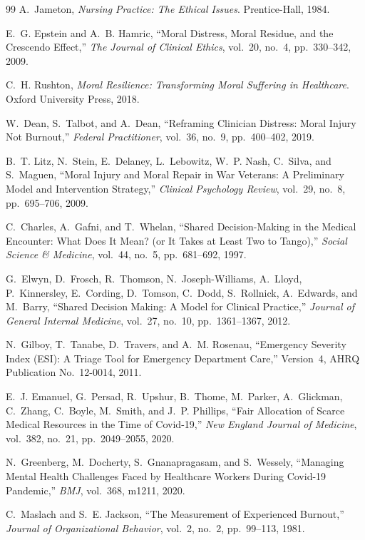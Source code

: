 \documentclass[12pt]{article}
\theoremstyle{definition}
\theoremstyle{remark}
\begin{document}
\begin{thebibliography}{99}
A.~Jameton, \emph{Nursing Practice: The Ethical Issues}.  Prentice-Hall, 1984.

E.~G. Epstein and A.~B. Hamric, ``Moral Distress, Moral Residue, and the Crescendo Effect,'' \emph{The Journal of Clinical Ethics}, vol.~20, no.~4, pp.~330--342, 2009.

C.~H. Rushton, \emph{Moral Resilience: Transforming Moral Suffering in Healthcare}.  Oxford University Press, 2018.

W.~Dean, S.~Talbot, and A.~Dean, ``Reframing Clinician Distress: Moral Injury Not Burnout,'' \emph{Federal Practitioner}, vol.~36, no.~9, pp.~400--402, 2019.

B.~T. Litz, N.~Stein, E.~Delaney, L.~Lebowitz, W.~P. Nash, C.~Silva, and S.~Maguen, ``Moral Injury and Moral Repair in War Veterans: A Preliminary Model and Intervention Strategy,'' \emph{Clinical Psychology Review}, vol.~29, no.~8, pp.~695--706, 2009.

C.~Charles, A.~Gafni, and T.~Whelan, ``Shared Decision-Making in the Medical Encounter: What Does It Mean? (or It Takes at Least Two to Tango),'' \emph{Social Science \& Medicine}, vol.~44, no.~5, pp.~681--692, 1997.

G.~Elwyn, D.~Frosch, R.~Thomson, N.~Joseph-Williams, A.~Lloyd, P.~Kinnersley, E.~Cording, D.~Tomson, C.~Dodd, S.~Rollnick, A.~Edwards, and M.~Barry, ``Shared Decision Making: A Model for Clinical Practice,'' \emph{Journal of General Internal Medicine}, vol.~27, no.~10, pp.~1361--1367, 2012.

N.~Gilboy, T.~Tanabe, D.~Travers, and A.~M. Rosenau, ``Emergency Severity Index (ESI): A Triage Tool for Emergency Department Care,'' Version~4, AHRQ Publication No.\ 12-0014, 2011.

E.~J. Emanuel, G.~Persad, R.~Upshur, B.~Thome, M.~Parker, A.~Glickman, C.~Zhang, C.~Boyle, M.~Smith, and J.~P. Phillips, ``Fair Allocation of Scarce Medical Resources in the Time of Covid-19,'' \emph{New England Journal of Medicine}, vol.~382, no.~21, pp.~2049--2055, 2020.

N.~Greenberg, M.~Docherty, S.~Gnanapragasam, and S.~Wessely, ``Managing Mental Health Challenges Faced by Healthcare Workers During Covid-19 Pandemic,'' \emph{BMJ}, vol.~368, m1211, 2020.

C.~Maslach and S.~E. Jackson, ``The Measurement of Experienced Burnout,'' \emph{Journal of Organizational Behavior}, vol.~2, no.~2, pp.~99--113, 1981.


\end{thebibliography}
\end{document}

